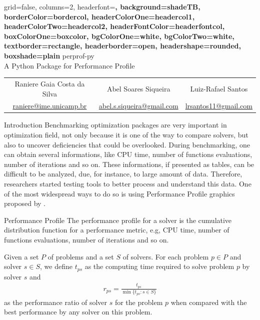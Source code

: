 \documentclass[a0paper,portrait]{baposter}
\begin{document}
\begin{poster}
  {
    grid=false,
    columns=2,
    headerfont=\Large\sf\bf,
    background=shadeTB,
    borderColor=bordercol,
    headerColorOne=headercol1,
    headerColorTwo=headercol2,
    headerFontColor=headerfontcol,
    boxColorOne=boxcolor,
    bgColorOne=white,
    bgColorTwo=white,
    textborder=rectangle,
    headerborder=open,
    headershape=rounded,
    boxshade=plain
  }
  {
    \unicamplogol
  }
  {
    perprof-py \\ A Python Package for Performance Profile
  }
  {
    \begin{tabular}{ccc}
      Raniere Gaia Costa da Silva &
      Abel Soares Siqueira &
      Luiz-Rafael Santos \\
      \url{raniere@ime.unicamp.br} &
      \url{abel.s.siqueira@gmail.com} &
      \url{lrsantos11@gmail.com}
    \end{tabular}
  }
  {
    \imecclogo
  }

  \begin{posterbox}[column=0]{Introduction}
    Benchmarking optimization packages are very important in optimization
    field, not only because it is one of the way to compare solvers, but also
    to uncover deficiencies that could be overlooked. During benchmarking, one
    can obtain several informations, like CPU time, number of functions
    evaluations, number of iterations and so on. These informations, if
    presented as tables, can be difficult to be analyzed, due, for instance,
    to large amount of data. Therefore, researchers started testing tools to
    better process and understand this data.  One of the most widespread ways
    to do so is using Performance Profile graphics proposed by
    \textcite{Dolan2001}.
  \end{posterbox}

  \begin{posterbox}[column=0,below=auto]{Performance Profile}
    The performance profile for a solver is the cumulative distribution
    function for a performance metric, e.g, CPU time, number of functions
    evaluations, number of iterations and so on.

    Given a set $P$ of problems and a set $S$ of solvers. For each problem $p
    \in P$ and solver $s \in S$, we define $t_{ps}$ as the computing time
    required to solve problem $p$ by solver $s$ and
    \begin{align*}
      r_{ps} = \frac{t_{ps}}{\min\{t_{ps}: s \in S\}}
    \end{align*}
    as the performance ratio of solver $s$ for the problem $p$ when compared
    with the best performance by any solver on this problem.


\end{posterbox}
\end{poster}
\end{document}
